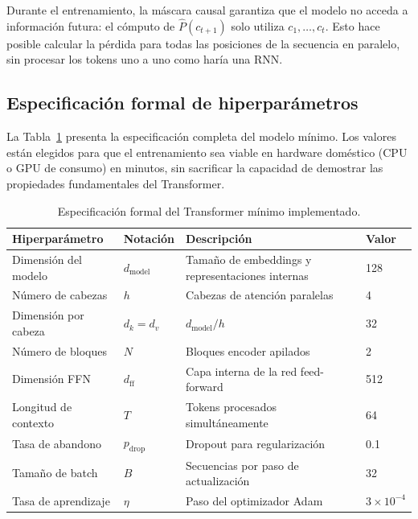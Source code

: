 Durante el entrenamiento, la máscara causal garantiza que el modelo no
acceda a información futura: el cómputo de $\hat{P}(c_{t+1})$ solo
utiliza $c_1, \ldots, c_t$. Esto hace posible calcular la pérdida para
todas las posiciones de la secuencia en paralelo, sin procesar los tokens
uno a uno como haría una RNN.

\subsection{Especificación formal de hiperparámetros}
\label{subsec:hiperparametros_minimo}

La Tabla~\ref{tab:hiperparametros_minimo} presenta la especificación completa
del modelo mínimo. Los valores están elegidos para que el entrenamiento
sea viable en hardware doméstico (CPU o GPU de consumo) en minutos, sin
sacrificar la capacidad de demostrar las propiedades fundamentales del
Transformer.

\begin{table}[H]
\centering
\caption{Especificación formal del Transformer mínimo implementado.}
\label{tab:hiperparametros_minimo}
\begin{tabularx}{\textwidth}{llXl}
\toprule
\textbf{Hiperparámetro} & \textbf{Notación} & \textbf{Descripción} & \textbf{Valor} \\
\midrule
Dimensión del modelo   & $d_{\text{model}}$ & Tamaño de embeddings y representaciones internas & 128 \\
Número de cabezas      & $h$               & Cabezas de atención paralelas & 4 \\
Dimensión por cabeza   & $d_k = d_v$       & $d_{\text{model}} / h$ & 32 \\
Número de bloques      & $N$               & Bloques encoder apilados & 2 \\
Dimensión FFN          & $d_{\text{ff}}$   & Capa interna de la red feed-forward & 512 \\
Longitud de contexto   & $T$               & Tokens procesados simultáneamente & 64 \\
Tasa de abandono       & $p_{\text{drop}}$ & Dropout para regularización & 0.1 \\
Tamaño de batch        & $B$               & Secuencias por paso de actualización & 32 \\
Tasa de aprendizaje    & $\eta$            & Paso del optimizador Adam & $3 \times 10^{-4}$ \\
\bottomrule
\end{tabularx}
\end{table}

